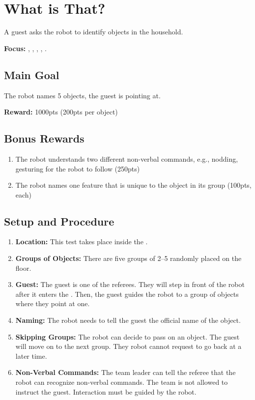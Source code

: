 \section{What is That?}
\label{test:what-is-that}
A guest asks the robot to identify objects in the household.

\noindent \textbf{Focus:} \SysI{}, \HRI{}, \GestRec{}, \CV{}, \OR{}.


\subsection*{Main Goal}
The robot names 5 objects, the guest is pointing at.

\noindent\textbf{Reward:} 1000pts (200pts per object)


\subsection*{Bonus Rewards}
\begin{enumerate}[nosep]
	\item The robot understands two different non-verbal commands, e.g., nodding, gesturing for the robot to follow (250pts)
	\item The robot names one feature that is unique to the object in its group (100pts, each)
\end{enumerate}


\subsection*{Setup and Procedure}
\begin{enumerate}[nosep]
	\item \textbf{Location:} This test takes place inside the \Arena{}.

	\item \textbf{Groups of Objects:} There are five groups of 2--5 \KnownObjects{} randomly placed on the floor.
	
	\item \textbf{Guest:} The guest is one of the referees. They will step in front of the robot after it enters the \Arena{}. Then, the guest guides the robot to a group of objects where they point at one.

	\item \textbf{Naming:} The robot needs to tell the guest the official name of the object.

	\item \textbf{Skipping Groups:} The robot can decide to pass on an object. The guest will move on to the next group. They robot cannot request to go back at a later time.
	
	\item \textbf{Non-Verbal Commands:} The team leader can tell the referee that the robot can recognize non-verbal commands. The team is not allowed to instruct the guest. Interaction must be guided by the robot.
\end{enumerate}


